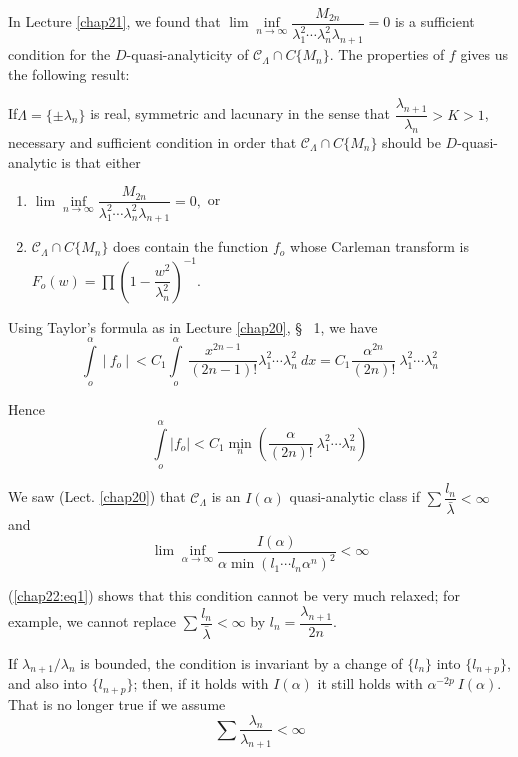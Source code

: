 In Lecture \ref{chap21}, we found that $\lim\inf\limits_{n \rightarrow \infty}
\dfrac{M_{2n}}{\lambda^2_1 \cdots \lambda^2_n \lambda_{n+1}} = 0$ is a
sufficient condition for the $D$-quasi-analyticity of
$\mathscr{C}_\Lambda \cap C\{ M_n\}$. The properties of $f$ gives us
the following result: 
\setcounter{theorem}{0}
\begin{theorem}\label{chap22:thm1}%
 If\pageoriginale $\Lambda = \{ \pm \lambda_n\}$ is real, symmetric and lacunary in
 the sense that $\dfrac{\lambda_{n+1}}{\lambda_n} > K > 1$, necessary
 and sufficient condition in order that $\mathscr{C}_\Lambda \cap
 C\{M_n \}$ should be $D$-quasi-analytic is that either 
 \begin{enumerate}[1)]
 \item $\lim\inf\limits_{n\rightarrow \infty}
 \dfrac{M_{2n}}{\lambda^2_1 \cdots \lambda^2_n \lambda_{n+1}} = 0,$
 or 
 \item $\mathscr{C}_\Lambda \cap C\{M_n \}$ does contain the function
 $f_o$ whose Carleman transform is $F_o (w) = \prod (1 -
 \dfrac{w^2}{\lambda^2_n})^{-1}$. 
 \end{enumerate}
\end{theorem}

Using Taylor's formula as in Lecture \ref{chap20}, \S ~ 1, we have
$$
\int\limits_o^\alpha ~ | ~ f_o ~ | ~ < C_1 \int\limits_{o}^\alpha ~
\frac{x^{2n-1}}{(2n -1)!}\lambda^2_1 \cdots \lambda^2_n ~ dx = C_1
\frac{\alpha^{2n}}{(2n)!} ~ \lambda^2_1 \cdots \lambda^2_n 
$$

Hence
\begin{equation}
 \int\limits_o^\alpha | f_o | < C_1 \min_n (\frac{\alpha}{(2n)!}
 ~\lambda^2_1 \cdots \lambda^2_n) \tag{1}\label{chap22:eq1} 
\end{equation}

We saw (Lect. \ref{chap20}) that $\mathscr{C}_\Lambda$ is an $I(\alpha)$
quasi-analytic class if $\sum \dfrac{l_n}{\bar{\lambda}} < \infty$ and 
\begin{equation}
 \lim\inf_{\alpha \rightarrow \infty } \frac{I(\alpha)}{\alpha \min
 (l_1 \cdots l_n \alpha^n)^2} < \infty \tag{2}\label{chap22:eq2} 
\end{equation}

(\ref{chap22:eq1}) shows that this condition cannot be very much relaxed; for
example, we cannot replace $\sum\dfrac{l_n}{\bar{\lambda}} < \infty$
by $l_n= \dfrac{\lambda_{n+1}}{2n}$. 

If $\lambda_{n+1}/\lambda_n$ is bounded, the condition is invariant by
a change of $\{ l_n\}$ into $\{l_{n+p} \}$, and also into $\{l_{n+p}
\}$; then, if it holds with $I(\alpha)$ it still holds with
$\alpha^{-2p} ~I(\alpha)$. That is no longer true if we assume 
\begin{equation} 
 \sum \frac{\lambda_n }{\lambda_{n+1}} < \infty \tag{3}\label{chap22:eq3}
\end{equation}

